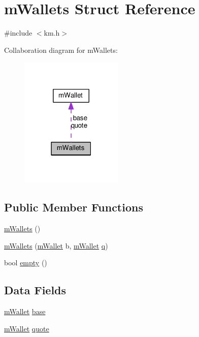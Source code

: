 \hypertarget{struct_k_1_1m_wallets}{}\section{m\+Wallets Struct Reference}
\label{struct_k_1_1m_wallets}


{\ttfamily \#include $<$km.\+h$>$}



Collaboration diagram for m\+Wallets\+:
\nopagebreak
\begin{figure}[H]
\begin{center}
\leavevmode
\includegraphics[width=138pt]{struct_k_1_1m_wallets__coll__graph}
\end{center}
\end{figure}
\subsection*{Public Member Functions}
\begin{DoxyCompactItemize}
\item 
\hyperlink{struct_k_1_1m_wallets_abcd72a711936c5391f4182544c9f9c84}{m\+Wallets} ()
\item 
\hyperlink{struct_k_1_1m_wallets_a97f25778ffc81e82ea69d0d9ecaa45d3}{m\+Wallets} (\hyperlink{struct_k_1_1m_wallet}{m\+Wallet} b, \hyperlink{struct_k_1_1m_wallet}{m\+Wallet} \hyperlink{namespace_k_a211862d8b09ec46a051464b6859c1306a7694f4a66316e53c8cdd9d9954bd611d}{q})
\item 
bool \hyperlink{struct_k_1_1m_wallets_a3f37b042a1e7cd4bd38fc564de81f0da}{empty} ()
\end{DoxyCompactItemize}
\subsection*{Data Fields}
\begin{DoxyCompactItemize}
\item 
\hyperlink{struct_k_1_1m_wallet}{m\+Wallet} \hyperlink{struct_k_1_1m_wallets_aa296cf3f15f714fd4d6d28a58fa2a86e}{base}
\item 
\hyperlink{struct_k_1_1m_wallet}{m\+Wallet} \hyperlink{struct_k_1_1m_wallets_a8845af0197ce15438cc6ad3e860259a8}{quote}
\end{DoxyCompactItemize}


